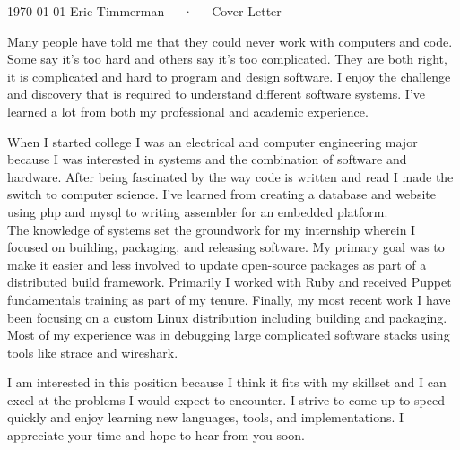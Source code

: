 \documentclass[11pt, letterpaper]{awesome-cv}
\begin{document}
\makecvheader

\makecvfooter
  {\today}
  {Eric Timmerman~~~·~~~Cover Letter}
  {}

\makelettertitle

\begin{cvletter}

Many people have told me that they could never work with computers and code. Some say it's too hard and others say it's too complicated. They are both right, it is complicated and hard to program and design software. I enjoy the challenge and discovery that is required to understand different software systems. I've learned a lot from both my professional and academic experience.

When I started college I was an electrical and computer engineering major because I was interested in systems and the combination of software and hardware. After being fascinated by the way code is written and read I made the switch to computer science. I've learned from creating a database and website using php and mysql to writing assembler for an embedded platform. \\
The knowledge of systems set the groundwork for my internship wherein I focused on building, packaging, and releasing software. My primary goal was to make it easier and less involved to update open-source packages as part of a distributed build framework. Primarily I worked with Ruby and received Puppet fundamentals training as part of my tenure. Finally, my most recent work I have been focusing on a custom Linux distribution including building and packaging. Most of my experience was in debugging large complicated software stacks using tools like strace and wireshark.

I am interested in this position because I think it fits with my skillset and I can excel at the problems I would expect to encounter. I strive to come up to speed quickly and enjoy learning new languages, tools, and implementations. I appreciate your time and hope to hear from you soon.

\end{cvletter}


\makeletterclosing
\end{document}
